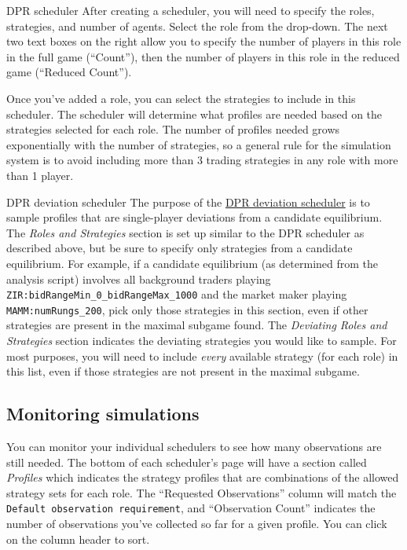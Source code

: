 \documentclass[11pt]{article}
\begin{document}
\begin{paragraph}{DPR scheduler}
After creating a scheduler, you will need to specify the roles, strategies, and number of agents. Select the role from the drop-down. The next two text boxes on the right allow you to specify the number of players in this role in the full game (``Count''), then the number of players in this role in the reduced game (``Reduced Count''). 

Once you've added a role, you can select the strategies to include in this scheduler. The scheduler will determine what profiles are needed based on the strategies selected for each role.
The number of profiles needed grows exponentially with the number of strategies, so a general rule for the simulation system is to avoid including more than 3 trading strategies in any role with more than 1 player.
\end{paragraph}

\begin{paragraph}{DPR deviation scheduler}
The purpose of the \href{http://egtaonline.eecs.umich.edu/dpr_deviation_schedulers/new}{DPR deviation scheduler} is to sample profiles that are single-player deviations from a candidate equilibrium.
The \emph{Roles and Strategies} section is set up similar to the DPR scheduler as described above, but be sure to specify only strategies from a candidate equilibrium. For example, if a candidate equilibrium (as determined from the analysis script) involves all background traders playing \verb|ZIR:bidRangeMin_0_bidRangeMax_1000| and the market maker playing \verb|MAMM:numRungs_200|, pick only those strategies in this section, even if other strategies are present in the maximal subgame found.
The \emph{Deviating Roles and Strategies} section indicates the deviating strategies you would like to sample. For most purposes, you will need to include \emph{every} available strategy (for each role) in this list, even if those strategies are not present in the maximal subgame.
\end{paragraph}


\subsection{Monitoring simulations}
You can monitor your individual schedulers to see how many observations are still needed. The bottom of each scheduler's page will have a section called \emph{Profiles} which indicates the strategy profiles that are combinations of the allowed strategy sets for each role. The ``Requested Observations'' column will match the \texttt{Default observation requirement}, and ``Observation Count'' indicates the number of observations you've collected so far for a given profile. You can click on the column header to sort.
\end{document}
